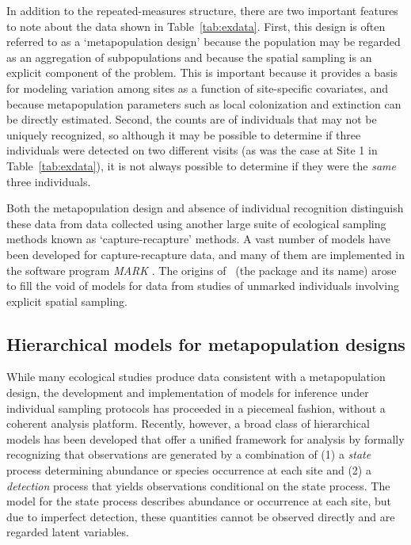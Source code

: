 \documentclass[article,shortnames]{jss}
\newcommand{\um}{\pkg{unmarked}}
\begin{document}
In addition to the repeated-measures structure, there are two important
features to note about the data shown in Table~\ref{tab:exdata}.  First,
this design is often referred to as a `metapopulation design' because
the population may be regarded as an aggregation of subpopulations and
because the spatial sampling is an explicit component of the problem.
This is important because it provides a basis for modeling variation
among sites as a function of site-specific covariates, and because
metapopulation parameters such as local colonization and extinction
can be directly estimated. Second, the counts are of individuals that
may not be uniquely recognized, so although it may be possible to
determine if three individuals were detected on two different visits
(as was the case at Site 1 in Table~\ref{tab:exdata}), it is not always
possible to determine if they were the {\it same} three individuals.

Both the metapopulation design and absence of individual recognition
distinguish these data from data collected using another large suite of
ecological sampling methods known as `capture-recapture' methods. A vast number
of models have been developed for capture-recapture data, and many of them
are implemented in the software program \emph{MARK}
\citep{whiteBurnham99_MARK}. The origins of \um\ (the package and its name)
arose to fill the void of models for data from studies of unmarked
individuals involving explicit spatial sampling.

\subsection{Hierarchical models for metapopulation designs}

While many ecological studies produce data consistent with a
metapopulation design, the development and implementation of
models for inference under individual sampling protocols has
proceeded in a piecemeal fashion, without a coherent analysis
platform. Recently, however, a broad
class of hierarchical models \citetext{see \citet{royleDorazio08} for a
general treatment} has been developed that offer a unified
framework for analysis by formally recognizing that observations are
generated by a combination of (1) a \emph{state} process
determining abundance or species occurrence at each site and (2) a
\emph{detection} process that yields observations conditional on the
state process. The model for the state process describes abundance or
occurrence at each site, but due to imperfect detection, these quantities
cannot be observed directly and are regarded latent variables.
\end{document}
